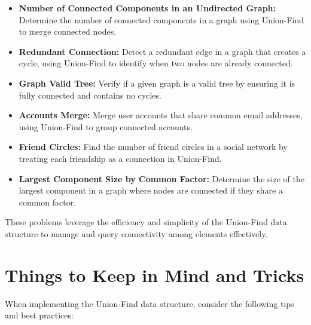\begin{itemize}
    \item \textbf{Number of Connected Components in an Undirected Graph:}  
    Determine the number of connected components in a graph using Union-Find to merge connected nodes.
    
    \item \textbf{Redundant Connection:}  
    Detect a redundant edge in a graph that creates a cycle, using Union-Find to identify when two nodes are already connected.
    
    \item \textbf{Graph Valid Tree:}  
    Verify if a given graph is a valid tree by ensuring it is fully connected and contains no cycles.
    
    \item \textbf{Accounts Merge:}  
    Merge user accounts that share common email addresses, using Union-Find to group connected accounts.
    
    \item \textbf{Friend Circles:}  
    Find the number of friend circles in a social network by treating each friendship as a connection in Union-Find.
    
    \item \textbf{Largest Component Size by Common Factor:}  
    Determine the size of the largest component in a graph where nodes are connected if they share a common factor.
\end{itemize}

These problems leverage the efficiency and simplicity of the Union-Find data structure to manage and query connectivity among elements effectively.

\section*{Things to Keep in Mind and Tricks}

When implementing the Union-Find data structure, consider the following tips and best practices:

